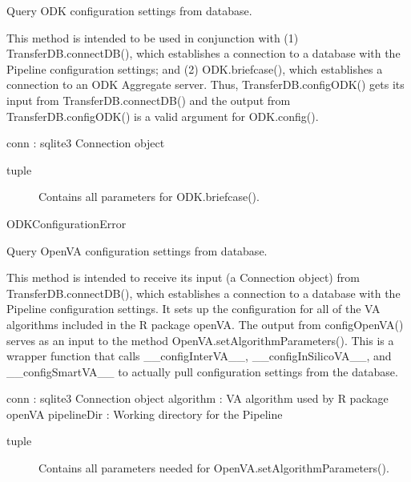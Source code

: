 \documentclass[letterpaper,12pt,english]{sphinxmanual}
\begin{document}
\begin{fulllineitems}

\begin{fulllineitems}
\label{\detokenize{help:transferDB.TransferDB.configODK}}
Query ODK configuration settings from database.

This method is intended to be used in conjunction with (1)
TransferDB.connectDB(), which establishes a connection to a database
with the Pipeline configuration settings; and (2) ODK.briefcase(), which
establishes a connection to an ODK Aggregate server.  Thus,
TransferDB.configODK() gets its input from TransferDB.connectDB() and
the output from TransferDB.configODK() is a valid argument for ODK.config().

conn : sqlite3 Connection object
\begin{description}
\item[{tuple}] \leavevmode
Contains all parameters for ODK.briefcase().

\end{description}

ODKConfigurationError

\end{fulllineitems}


\begin{fulllineitems}
\label{\detokenize{help:transferDB.TransferDB.configOpenVA}}
Query OpenVA configuration settings from database.

This method is intended to receive its input (a Connection object) 
from TransferDB.connectDB(), which establishes a connection to a
database with the Pipeline configuration settings.  It sets up the
configuration for all of the VA algorithms included in the R package
openVA.  The output from configOpenVA() serves as an input to the
method OpenVA.setAlgorithmParameters().  This is a wrapper function
that calls \_\_configInterVA\_\_, \_\_configInSilicoVA\_\_, and
\_\_configSmartVA\_\_ to actually pull configuration settings from the
database.

conn : sqlite3 Connection object
algorithm : VA algorithm used by R package openVA
pipelineDir : Working directory for the Pipeline
\begin{description}
\item[{tuple}] \leavevmode
Contains all parameters needed for OpenVA.setAlgorithmParameters().


\end{description}
\end{fulllineitems}
\end{fulllineitems}
\end{document}
